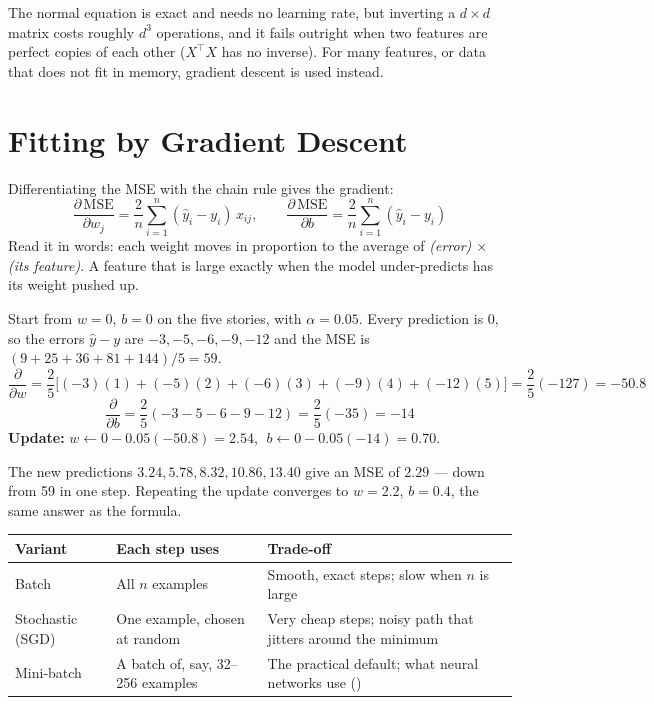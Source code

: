 The normal equation is exact and needs no learning rate, but inverting a
$d \times d$ matrix costs roughly $d^3$ operations, and it fails outright when
two features are perfect copies of each other ($X^{\top}X$ has no inverse). For
many features, or data that does not fit in memory, gradient descent is used
instead.

\section{Fitting by Gradient Descent}

Differentiating the MSE with the chain rule gives the gradient:
\[
\frac{\partial\,\text{MSE}}{\partial w_j} = \frac{2}{n}\sum_{i=1}^{n}(\hat{y}_i - y_i)\,x_{ij},
\qquad
\frac{\partial\,\text{MSE}}{\partial b} = \frac{2}{n}\sum_{i=1}^{n}(\hat{y}_i - y_i)
\]
Read it in words: each weight moves in proportion to the average of
\emph{(error) $\times$ (its feature)}. A feature that is large exactly when the
model under-predicts has its weight pushed up.

\begin{worked}
Start from $w = 0$, $b = 0$ on the five stories, with $\alpha = 0.05$. Every
prediction is 0, so the errors $\hat{y} - y$ are $-3, -5, -6, -9, -12$ and the
MSE is $(9 + 25 + 36 + 81 + 144)/5 = 59$.
\[
\frac{\partial}{\partial w} = \frac{2}{5}\big[(-3)(1) + (-5)(2) + (-6)(3) + (-9)(4) + (-12)(5)\big]
= \frac{2}{5}(-127) = -50.8
\]
\[
\frac{\partial}{\partial b} = \frac{2}{5}(-3 - 5 - 6 - 9 - 12) = \frac{2}{5}(-35) = -14
\]
\textbf{Update:} $w \leftarrow 0 - 0.05(-50.8) = 2.54$, $\;b \leftarrow 0 - 0.05(-14)
= 0.70$.

The new predictions $3.24, 5.78, 8.32, 10.86, 13.40$ give an MSE of $2.29$ --- down
from 59 in one step. Repeating the update converges to $w = 2.2$, $b = 0.4$, the
same answer as the formula.
\end{worked}

\begin{longtable}{@{}L{3.3cm}L{5.4cm}L{6.3cm}@{}}
\toprule
{}
\textbf{Variant} & \textbf{Each step uses} & \textbf{Trade-off} \\
\midrule
\endhead
Batch & All $n$ examples & Smooth, exact steps; slow when $n$ is large \\
Stochastic (SGD) & One example, chosen at random & Very cheap steps; noisy path
that jitters around the minimum \\
Mini-batch & A batch of, say, 32--256 examples & The practical default; what
neural networks use () \\
\bottomrule
\end{longtable}

